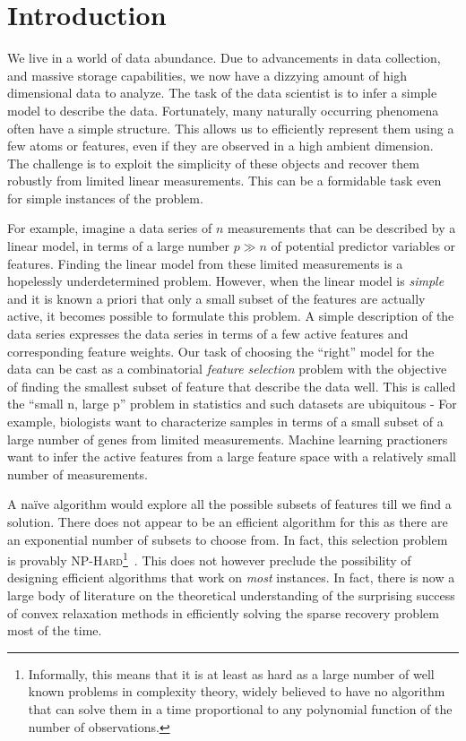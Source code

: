 \chapter{Introduction}

We live in a world of data abundance. Due to advancements in data collection,
and massive storage capabilities, we now have a dizzying amount of high
dimensional data to analyze. The task of the data scientist is to infer a simple
model to describe the data. Fortunately, many naturally occurring phenomena
often have a simple structure. This allows us to efficiently represent them
using a few atoms or features, even if they are observed in a high ambient
dimension. The challenge is to exploit the simplicity of these objects and
recover them robustly from limited linear measurements. This can be a formidable
task even for simple instances of the problem.

For example, imagine a data series of $n$ measurements that can be described by
a linear model, in terms of a large number $p \gg n$ of potential predictor
variables or features. Finding the linear model from these limited measurements
is a hopelessly underdetermined problem. However, when the linear model is
\emph{simple} and it is known a priori that only a small subset of the features
are actually active, it becomes possible to formulate this problem. A simple
description of the data series expresses the data series in terms of a few
active features and corresponding feature weights. Our task of choosing the
``right'' model for the data can be cast as a combinatorial \emph{feature
selection} problem with the objective of finding the smallest subset of feature
that describe the data well. This is called the ``small n, large p'' problem in
statistics and such datasets are ubiquitous - For example, biologists want to
characterize samples in terms of a small subset of a large number of genes from
limited measurements. Machine learning practioners want to infer the active
features from a large feature space with a relatively small number of
measurements.

A naïve algorithm would explore all the possible subsets of features till we
find a solution. There does not appear to be an efficient algorithm for this as
there are an exponential number of subsets to choose from. In fact, this
selection problem is provably \textsc{NP-Hard}\footnote{Informally, this means
that it is at least as hard as a large number of well known problems in
complexity theory, widely believed to have no algorithm that can solve them in a
time proportional to any polynomial function of the number of
observations.}~\cite{Natarajan95}. This does not however preclude the
possibility of designing efficient algorithms that work on \emph{most}
instances. In fact, there is now a large body of literature on the theoretical
understanding of the surprising success of convex relaxation methods in
efficiently solving the sparse recovery problem most of the time.


